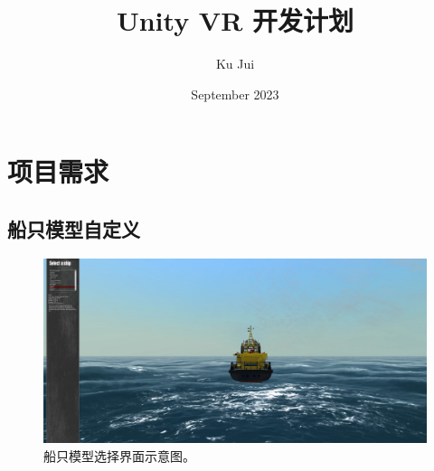 \documentclass[a4paper,10pt]{article}
\begin{document}
	
	
	\title{\songti {}Unity VR 开发计划}
	\author{\textrm{Ku Jui}}
	\date{\textrm{September 2023}}
	\maketitle
	
	\renewcommand{\figurename}{Figure} %
	\renewcommand{\contentsname}{Contents}
	\renewcommand{\tablename}{Table}
	\tableofcontents  %
	

	\section{项目需求}
	
		\subsection{船只模型自定义}
		
		\begin{figure}[htbp]
			\centering				
			\includegraphics[width=0.7\columnwidth]{picture/Select a ship}
			\caption{
				\label{fig: Select a ship} 
				船只模型选择界面示意图。
			}	
		\end{figure}
		
\end{document}
